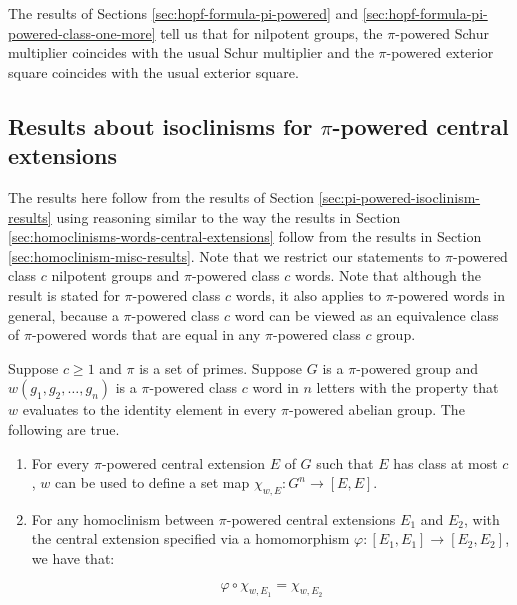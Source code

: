 \documentclass{ucetd}
\begin{document}
The results of Sections \ref{sec:hopf-formula-pi-powered} and
\ref{sec:hopf-formula-pi-powered-class-one-more} tell us that for
nilpotent groups, the $\pi$-powered Schur multiplier coincides with
the usual Schur multiplier and the $\pi$-powered exterior square
coincides with the usual exterior square.

\subsection{Results about isoclinisms for $\pi$-powered central extensions}\label{sec:isoclinisms-pi-powered-central-extensions}

The results here follow from the results of Section
\ref{sec:pi-powered-isoclinism-results} using reasoning similar to the
way the results in Section
\ref{sec:homoclinisms-words-central-extensions} follow from the
results in Section \ref{sec:homoclinism-misc-results}. Note that we
restrict our statements to $\pi$-powered class $c$ nilpotent groups
and $\pi$-powered class $c$ words. Note that although the result is
stated for $\pi$-powered class $c$ words, it also applies to
$\pi$-powered words in general, because a $\pi$-powered class $c$ word
can be viewed as an equivalence class of $\pi$-powered words that are
equal in any $\pi$-powered class $c$ group.

\begin{lemma}\label{lemma:iterated-commutator-descends-extension-version-pi-powered}
  Suppose $c \ge 1$ and $\pi$ is a set of primes. Suppose $G$ is a
  $\pi$-powered group and $w(g_1,g_2,\dots,g_n)$ is a $\pi$-powered
  class $c$ word in $n$ letters with the property that $w$ evaluates
  to the identity element in every $\pi$-powered abelian group. The
  following are true.

  \begin{enumerate}
  \item For every $\pi$-powered central extension $E$ of $G$ such that
    $E$ has class at most $c$, $w$ can be used to define a set map
    $\chi_{w,E}: G^n \to [E,E]$.
  \item For any homoclinism between $\pi$-powered central extensions
    $E_1$ and $E_2$, with the central extension specified via a
    homomorphism $\varphi:[E_1,E_1] \to [E_2,E_2]$, we have that:

    $$\varphi \circ \chi_{w,E_1} = \chi_{w,E_2}$$
  \end{enumerate}
\end{lemma}

\end{document}
